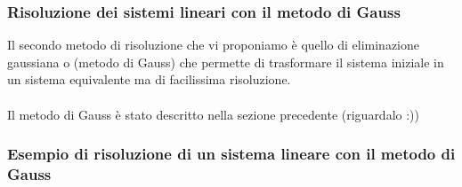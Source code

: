 \documentclass{report}
\begin{document}
\subsubsection{Risoluzione dei sistemi lineari con il metodo di Gauss}

Il secondo metodo di risoluzione che vi proponiamo è quello di eliminazione gaussiana o (metodo di Gauss) che permette di trasformare il sistema iniziale in un sistema equivalente ma di facilissima risoluzione.
\\
\\
Il metodo di Gauss è stato descritto nella sezione precedente (riguardalo :))


\subsubsection{Esempio di risoluzione di un sistema lineare con il metodo di Gauss}
\end{document}
